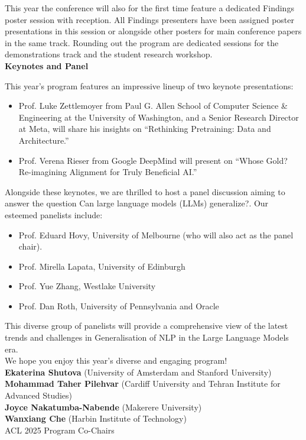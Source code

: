 This year the conference will also for the first time feature a dedicated Findings poster session with reception. All Findings presenters have been assigned poster presentations in this session or alongside other posters for main conference papers in the same track.
Rounding out the program are dedicated sessions for the demonstrations track and the student research workshop.\\


\textbf{Keynotes and Panel}

This year’s program features an impressive lineup of two keynote presentations:
\begin{itemize}
\item Prof. Luke Zettlemoyer from Paul G. Allen School of Computer Science & Engineering at the University of Washington, and a Senior Research Director at Meta, will share his insights on “Rethinking Pretraining: Data and Architecture.”
\item Prof. Verena Rieser from Google DeepMind will present on “Whose Gold? Re-imagining Alignment for Truly Beneficial AI.”
\end{itemize}

Alongside these keynotes, we are thrilled to host a panel discussion aiming to answer the question Can large language models (LLMs) generalize?. Our esteemed panelists include:
\begin{itemize}
\item Prof. Eduard Hovy, University of Melbourne (who will also act as the panel chair).
\item Prof. Mirella Lapata, University of Edinburgh
\item Prof. Yue Zhang, Westlake University
\item Prof. Dan Roth, University of Pennsylvania and Oracle
\end{itemize}

This diverse group of panelists will provide a comprehensive view of the latest trends and challenges in Generalisation of NLP in the Large Language Models era. \\

We hope you enjoy this year’s diverse and engaging program!\\

\textbf{Ekaterina Shutova} (University of Amsterdam and Stanford University)\\
\textbf{Mohammad Taher Pilehvar} (Cardiff University and Tehran Institute for Advanced Studies)\\
\textbf{Joyce Nakatumba-Nabende} (Makerere University)\\
\textbf{Wanxiang Che} (Harbin Institute of Technology)\\

ACL 2025 Program Co-Chairs
